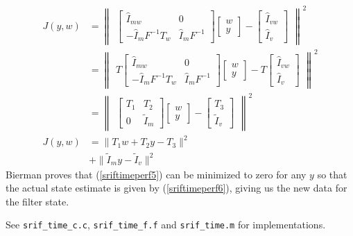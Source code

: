 \begin{subequations}
\begin{align}
J(y,w)
  & = \begin{Vmatrix}
        \begin{bmatrix}
              {\hat I}_{mw}         & 0
          \\ -{\hat I}_m F^{-1} T_w & {\hat I}_m F^{-1}
        \end{bmatrix}
        \begin{bmatrix} w \\ y \end{bmatrix} -
        \begin{bmatrix} {\hat I}_{vw} \\ {\hat I}_v \end{bmatrix}
      \end{Vmatrix}^2
\label{sriftimeperf3}
\\
  & = \begin{Vmatrix}
      T \begin{bmatrix}
              {\hat I}_{mw}         & 0
          \\ -{\hat I}_m F^{-1} T_w & {\hat I}_m F^{-1}
        \end{bmatrix}
        \begin{bmatrix} w \\ y \end{bmatrix} -
      T \begin{bmatrix} {\hat I}_{vw} \\ {\hat I}_v \end{bmatrix}
      \end{Vmatrix}^2
\\
  & = \begin{Vmatrix}
        \begin{bmatrix}
           T_1 & T_2
        \\ 0                  & {\tilde I}_m
        \end{bmatrix}
        \begin{bmatrix} w \\ y \end{bmatrix} -
        \begin{bmatrix} T_3 \\ {\tilde I}_v \end{bmatrix}
      \end{Vmatrix}^2
\label{sriftimeperf4}
\\
J(y,w)
  & = \lVert T_1 w + T_2 y - T_3 \rVert^2
\label{sriftimeperf5}
\\
  & + \lVert {\tilde I}_m y -
             {\tilde I}_v \rVert^2
\label{sriftimeperf6}
\end{align}
\end{subequations}
Bierman proves that (\ref {sriftimeperf5}) can be minimized
to zero for any ${y}$ so that the actual state estimate
is given by (\ref{sriftimeperf6}),
giving us the new data for the filter state.

See \verb|srif_time_c.c|, \verb|srif_time_f.f| and \verb|srif_time.m|
for implementations.
